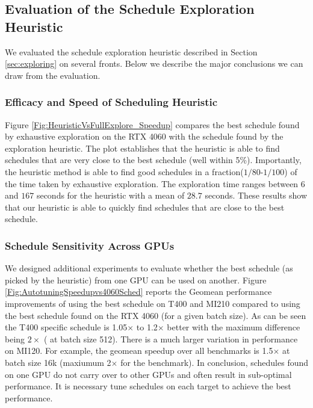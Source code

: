 \subsection{Evaluation of the Schedule Exploration Heuristic}
We evaluated the schedule exploration heuristic described in Section \ref{sec:exploring} on several fronts.
Below we describe the major conclusions we can draw from the evaluation.

\subsubsection*{Efficacy and Speed of Scheduling Heuristic}
Figure \ref{Fig:HeuristicVsFullExplore_Speedup} compares the best schedule found by exhaustive exploration on the RTX 4060 
with the schedule found by the exploration heuristic.
The plot establishes that the 
heuristic is able to find schedules that are very close to the best schedule (well 
within 5\%). 
Importantly, the heuristic method is able to find good schedules in a fraction($1/80$-$1/100$) of the time taken by exhaustive exploration.
The exploration time ranges between $6$ and $167$ seconds for the heuristic with a mean of $28.7$ seconds.
These results show that our heuristic is able to quickly find schedules that are close to the best schedule.

\subsubsection*{Schedule Sensitivity Across GPUs}
We designed additional experiments to evaluate whether the best schedule (as picked by the heuristic) from one GPU can be used on another.
Figure \ref{Fig:AutotuningSpeedupvs4060Sched} reports the Geomean performance improvements of using the best schedule on T400 and MI210 compared to using the best schedule found on the RTX 4060 (for a given batch size).
As can be seen the T400 specific schedule is 1.05$\times$ to 1.2$\times$ better 
with the maximum difference being $2\times$ ( at batch size 512).
There is a much larger variation in performance on MI120. For example, 
the geomean speedup over all benchmarks is 1.5$\times$ at batch size 16k (maxiumum 2$\times$ for the  benchmark).
In conclusion, schedules found on one GPU do not carry over to other GPUs and often result in sub-optimal performance.
It is necessary tune schedules on each target to achieve the best performance.

